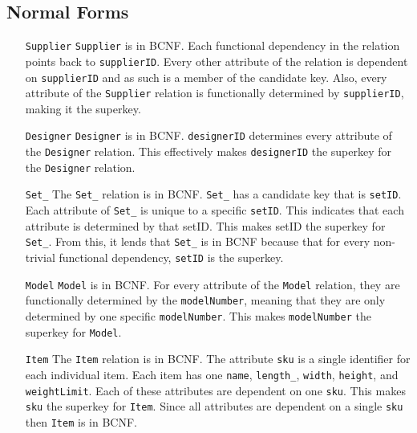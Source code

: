 \documentclass[american,extrafontsizes,12pt,portrait,letterpaper,oneside,onecolumn,article,final]{memoir}
\newcommand*{\sqli}[1]{\texttt{#1}}
\begin{document}
\inputminted[linenos]{sql}{normalized.sql}

\subsection*{Normal Forms}
%

\begin{enumerate}[leftmargin=*,widest={\texttt{DistributionCenter}}]

\item[\sqli{Supplier}]
\sqli{Supplier} is in BCNF.
Each functional dependency in the relation points back to \sqli{supplierID}.
Every other attribute of the relation is dependent on \sqli{supplierID} and as such is a member of the candidate key.
Also, every attribute of the \sqli{Supplier} relation is functionally determined by \sqli{supplierID}, making it the superkey.

\item[\sqli{Designer}]
\sqli{Designer} is in BCNF.
\sqli{designerID} determines every attribute of the \sqli{Designer} relation.
This effectively makes \sqli{designerID} the superkey for the \sqli{Designer} relation.

\item[\sqli{Set_}]
The \sqli{Set_} relation is in BCNF.
\sqli{Set_} has a candidate key that is \sqli{setID}.
Each attribute of \sqli{Set_} is unique to a specific \sqli{setID}.
This indicates that each attribute is determined by that setID.
This makes setID the superkey for \sqli{Set_}.
From this, it lends that \sqli{Set_} is in BCNF because that for every non\hyp trivial functional dependency, \sqli{setID} is the superkey.

\item[\sqli{Model}]
\sqli{Model} is in BCNF.
For every attribute of the \sqli{Model} relation, they are functionally determined by the \sqli{modelNumber}, meaning that they are only determined by one specific \sqli{modelNumber}.
This makes \sqli{modelNumber} the superkey for \sqli{Model}.

\item[\sqli{Item}]
The \sqli{Item} relation is in BCNF.
The attribute \sqli{sku} is a single identifier for each individual item.
Each item has one \sqli{name}, \sqli{length_}, \sqli{width}, \sqli{height}, and \sqli{weightLimit}. Each of these attributes are dependent on one \sqli{sku}.
This makes \sqli{sku} the superkey for \sqli{Item}.
Since all attributes are dependent on a single \sqli{sku} then \sqli{Item} is in BCNF.


\end{enumerate}
\end{document}
